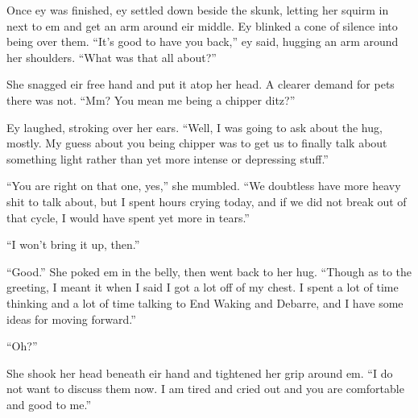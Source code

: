 Once ey was finished, ey settled down beside the skunk, letting her squirm in next to em and get an arm around eir middle. Ey blinked a cone of silence into being over them. ``It's good to have you back,'' ey said, hugging an arm around her shoulders. ``What was that all about?''

She snagged eir free hand and put it atop her head. A clearer demand for pets there was not. ``Mm? You mean me being a chipper ditz?''

Ey laughed, stroking over her ears. ``Well, I was going to ask about the hug, mostly. My guess about you being chipper was to get us to finally talk about something light rather than yet more intense or depressing stuff.''

``You are right on that one, yes,'' she mumbled. ``We doubtless have more heavy shit to talk about, but I spent hours crying today, and if we did not break out of that cycle, I would have spent yet more in tears.''

``I won't bring it up, then.''

``Good.'' She poked em in the belly, then went back to her hug. ``Though as to the greeting, I meant it when I said I got a lot off of my chest. I spent a lot of time thinking and a lot of time talking to End Waking and Debarre, and I have some ideas for moving forward.''

``Oh?''

She shook her head beneath eir hand and tightened her grip around em. ``I do not want to discuss them now. I am tired and cried out and you are comfortable and good to me.''
